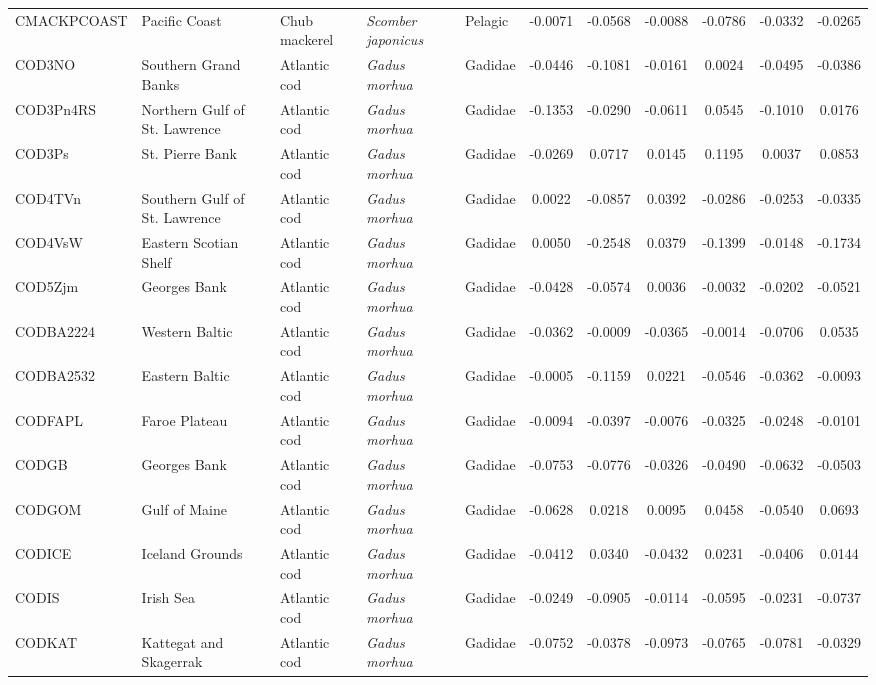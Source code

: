 \begin{longtable}{p{3cm}p{3cm}lllcccccc}
  CMACKPCOAST & Pacific Coast & Chub mackerel & \textit{Scomber japonicus} & Pelagic & -0.0071 & -0.0568 & -0.0088 & -0.0786 & -0.0332 & -0.0265 \\
  COD3NO & Southern Grand Banks & Atlantic cod & \textit{Gadus morhua} & Gadidae & -0.0446 & -0.1081 & -0.0161 & 0.0024 & -0.0495 & -0.0386 \\
  COD3Pn4RS & Northern Gulf of St. Lawrence & Atlantic cod & \textit{Gadus morhua} & Gadidae & -0.1353 & -0.0290 & -0.0611 & 0.0545 & -0.1010 & 0.0176 \\
  COD3Ps & St. Pierre Bank & Atlantic cod & \textit{Gadus morhua} & Gadidae & -0.0269 & 0.0717 & 0.0145 & 0.1195 & 0.0037 & 0.0853 \\
  COD4TVn & Southern Gulf of St. Lawrence & Atlantic cod & \textit{Gadus morhua} & Gadidae & 0.0022 & -0.0857 & 0.0392 & -0.0286 & -0.0253 & -0.0335 \\
  COD4VsW & Eastern Scotian Shelf & Atlantic cod & \textit{Gadus morhua} & Gadidae & 0.0050 & -0.2548 & 0.0379 & -0.1399 & -0.0148 & -0.1734 \\
  COD5Zjm & Georges Bank & Atlantic cod & \textit{Gadus morhua} & Gadidae & -0.0428 & -0.0574 & 0.0036 & -0.0032 & -0.0202 & -0.0521 \\
  CODBA2224 & Western Baltic & Atlantic cod & \textit{Gadus morhua} & Gadidae & -0.0362 & -0.0009 & -0.0365 & -0.0014 & -0.0706 & 0.0535 \\
  CODBA2532 & Eastern Baltic & Atlantic cod & \textit{Gadus morhua} & Gadidae & -0.0005 & -0.1159 & 0.0221 & -0.0546 & -0.0362 & -0.0093 \\
  CODFAPL & Faroe Plateau & Atlantic cod & \textit{Gadus morhua} & Gadidae & -0.0094 & -0.0397 & -0.0076 & -0.0325 & -0.0248 & -0.0101 \\
  CODGB & Georges Bank & Atlantic cod & \textit{Gadus morhua} & Gadidae & -0.0753 & -0.0776 & -0.0326 & -0.0490 & -0.0632 & -0.0503 \\
  CODGOM & Gulf of Maine & Atlantic cod & \textit{Gadus morhua} & Gadidae & -0.0628 & 0.0218 & 0.0095 & 0.0458 & -0.0540 & 0.0693 \\
  CODICE & Iceland Grounds & Atlantic cod & \textit{Gadus morhua} & Gadidae & -0.0412 & 0.0340 & -0.0432 & 0.0231 & -0.0406 & 0.0144 \\
  CODIS & Irish Sea & Atlantic cod & \textit{Gadus morhua} & Gadidae & -0.0249 & -0.0905 & -0.0114 & -0.0595 & -0.0231 & -0.0737 \\
  CODKAT & Kattegat and Skagerrak & Atlantic cod & \textit{Gadus morhua} & Gadidae & -0.0752 & -0.0378 & -0.0973 & -0.0765 & -0.0781 & -0.0329 \\

\end{longtable}
